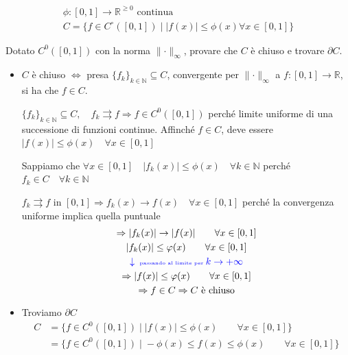 \begin{exbar}
\begin{example}
	\begin{gather*}
		\phi: [0,1] \rightarrow \mathbb{R}^{\geq 0} \text{ continua}
		\\
		C = \{ f \in C^\circ ([0,1]) \; \big| \; |f(x)| \leq \phi(x) \forall x \in [0,1] \}
	\end{gather*}

	Dotato $C^0 ([0,1])$ con la norma $\parallel \cdot \parallel_\infty$, provare che $C$ è chiuso e trovare $\partial C$.
	\begin{itemize}
		\item $C$ è chiuso $\iff$ presa $\{f_k\}_{k \in \mathbb{N}} \subseteq C$, convergente per $\parallel \cdot \parallel_\infty$ a $f:[0,1] \rightarrow \mathbb{R}$, si ha che $f \in C$.
		
		$\{ f_k \}_{k \in \mathbb{N}} \subseteq C, \quad f_k \rightrightarrows f \Rightarrow f \in C^0([0,1])$ perché limite uniforme di una successione di funzioni continue. Affinché $f \in C$, deve essere $|f(x)| \leq \phi(x) \quad \forall x \in [0,1]$
		
		Sappiamo che $\forall x \in [0,1] \quad |f_k(x)| \leq \phi(x) \quad \forall k \in \mathbb{N}$ perché $f_k \in C \quad \forall k \in \mathbb{N}$
		
		$f_k \rightrightarrows f$ in $[0,1] \Rightarrow f_k(x) \rightarrow f(x) \quad \forall x \in [0,1] $ perché la convergenza uniforme implica quella puntuale 
		\begin{gather*}
			\Rightarrow |f_k(x)| \rightarrow |f(x)| \qquad \forall x \in [0,1]
			\\
			|f_k(x)| \leq \phi(x) \qquad \forall x \in [0,1]
			\\
			\color{blue}{ \tiny{\downarrow \text{ passando al limite per } k \to +\infty } } 
			\\
			\Rightarrow |f(x)| \leq \phi(x) \qquad \forall x \in [0,1]
			\\
			\Rightarrow f \in C \Rightarrow C \text{ è chiuso}
		\end{gather*}

		\item Troviamo $\partial C$
		\begin{align*}
			C 
			&= \{ f \in C^0 ([0,1]) \; \big| \; |f(x)| \leq \phi(x) \qquad \forall x \in [0,1] \} 
			\\
			&= \{ f \in C^0 ([0,1]) \; \big| \; -\phi(x) \leq f(x) \leq \phi(x) \qquad \forall x \in [0,1] \}
		\end{align*}


\end{itemize}
\end{example}
\end{exbar}
